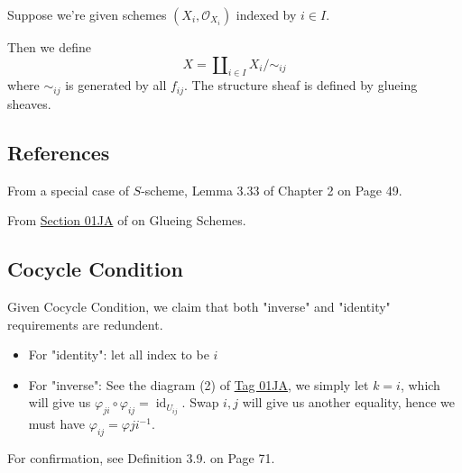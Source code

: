 Suppose we're given schemes $(X_i,\mathcal O_{X_i})$ indexed by $i\in I$.

Then we define 
\[X=\amalg_{i\in I}X_i/\sim_{ij}\]where $\sim_{ij}$ is generated by all $f_{ij}$. The structure sheaf is defined by glueing sheaves. 

\subsection{References}

From a special case of $S$-scheme, \cite{qing2006algebraic} Lemma 3.33 of Chapter 2 on Page 49.

From \href{https://stacks.math.columbia.edu/tag/01JA}{Section 01JA} of \cite{stacks-project} on Glueing Schemes.

\subsection{Cocycle Condition}
Given Cocycle Condition, we claim that both "inverse" and "identity" requirements are redundent. 
\begin{itemize}

\item For "identity": let all index to be $i$
\item For "inverse": See the diagram (2) of \href{https://stacks.math.columbia.edu/tag/01JA}{Tag 01JA}, we simply let $k=i$, which will give us $\varphi_{ji}\circ\varphi_{ij}=\operatorname{id}_{U_{ij}}$. Swap $i,j$ will give us another equality, hence we must have $\varphi_{ij}=\varphi{ji}^{-1}$.
\end{itemize}

For confirmation, see \cite{gortz2020algebraic} Definition 3.9. on Page 71.